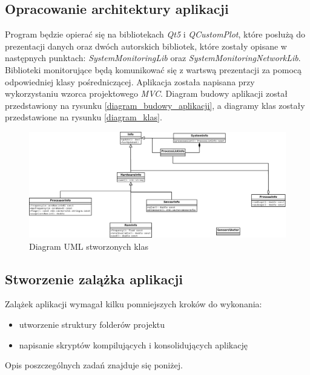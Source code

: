 \documentclass[a4paper]{article}
\begin{document}
\subsection{Opracowanie architektury aplikacji}
Program będzie opierać się na bibliotekach \textit{Qt5} i \textit{QCustomPlot}, które posłużą do prezentacji danych oraz dwóch autorskich bibliotek, które zostały opisane w następnych punktach: \textit{SystemMonitoringLib} oraz \textit{SystemMonitoringNetworkLib}. Biblioteki monitorujące będą komunikować się z wartswą prezentacji za pomocą odpowiedniej klasy pośredniczącej. Aplikacja została napisana przy wykorzystaniu wzorca projektowego \textit{MVC}. Diagram budowy aplikacji został przedstawiony na rysunku \ref{diagram_budowy_aplikacji}, a diagramy klas zostały przedstawione na rysunku \ref{diagram_klas}.



\begin{figure}[h]
	\centering
	\includegraphics[width=0.75\paperheight, angle=90]{img/diagramKlas.png}
	\caption{Diagram UML stworzonych klas}
\end{figure}


\subsection{Stworzenie zalążka aplikacji}

Zalążek aplikacji wymagał kilku pomniejszych kroków do wykonania:
\begin{itemize}
	\item utworzenie struktury folderów projektu
	\item napisanie skryptów kompilujących i konsolidujących aplikację
\end{itemize}
Opis poszczególnych zadań znajduje się poniżej.
\end{document}
